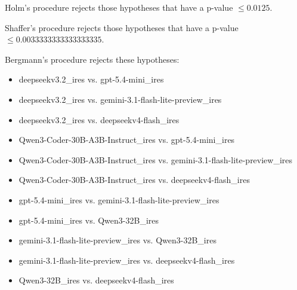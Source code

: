 \documentclass[a4paper,10pt]{article}
\begin{document}
\begin{landscape}
Holm's procedure rejects those hypotheses that have a p-value $\le0.0125$.


Shaffer's procedure rejects those hypotheses that have a p-value $\le0.0033333333333333335$.


Bergmann's procedure rejects these hypotheses:


\begin{itemize}


\item deepseekv3.2_ires vs. gpt-5.4-mini_ires\item deepseekv3.2_ires vs. gemini-3.1-flash-lite-preview_ires\item deepseekv3.2_ires vs. deepseekv4-flash_ires\item Qwen3-Coder-30B-A3B-Instruct_ires vs. gpt-5.4-mini_ires\item Qwen3-Coder-30B-A3B-Instruct_ires vs. gemini-3.1-flash-lite-preview_ires\item Qwen3-Coder-30B-A3B-Instruct_ires vs. deepseekv4-flash_ires\item gpt-5.4-mini_ires vs. gemini-3.1-flash-lite-preview_ires\item gpt-5.4-mini_ires vs. Qwen3-32B_ires\item gemini-3.1-flash-lite-preview_ires vs. Qwen3-32B_ires\item gemini-3.1-flash-lite-preview_ires vs. deepseekv4-flash_ires\item Qwen3-32B_ires vs. deepseekv4-flash_ires\end{itemize}



\end{landscape}
\end{document}
